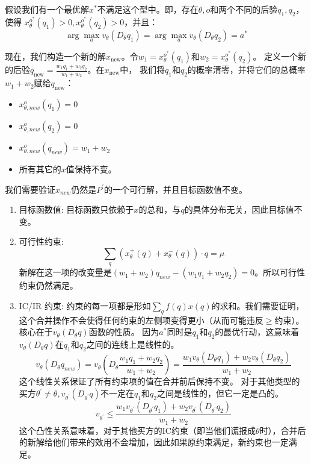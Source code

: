 假设我们有一个最优解$x^\ast$不满足这个型中。即，存在$\theta,o$和两个不同的后验$q_1,q_2$，使得
$x_{\theta}^{o^\ast}(q_1)>0, x_{\theta}^{o^\ast}(q_2)>0$，并且：
$$\arg \max_{a} v_{\theta} (D_{\theta}q_1)=\arg\max_{a}v_{\theta}(D_{\theta}q_2)=a^\ast$$

现在，我们构造一个新的解$x_{\text{new}}$。令$w_1=x_{\theta}^{o^\ast}(q_1)$和$w_2=x_{\theta}^{o^\ast}(q_2)$。
定义一个新的后验$q_{\text{new}} = \frac{w_1 q_1 + w_2 q_2}{w_1 + w_2}$。在$x_{\text{new}}$中，
我们将$q_1$和$q_2$的概率清零，并将它们的总概率$w_1 + w_2$赋给$q_{\text{new}}$：

\begin{itemize}
    \item $x_{\theta,new}^{o}(q_1) = 0$
    \item $x_{\theta,new}^{o}(q_2) = 0$
    \item $x_{\theta,new}^{o}(q_{new}) = w_1 + w_2$
    \item 所有其它的$x$值保持不变。
\end{itemize}

我们需要验证$x_{new}$仍然是$P^\prime$的一个可行解，并且目标函数值不变。

\begin{enumerate}
    \item 目标函数值: 目标函数只依赖于$x$的总和，与$q$的具体分布无关，因此目标值不变。
    \item 可行性约束:$$\sum\limits_{q}\left(x_{\theta}^{+}(q)+x_{\theta}^{-}(q)\right)\cdot q = \mu$$ 新解在这一项的改变量是$(w_1 + w_2) q_{new} - (w_1 q_1 + w_2 q_2) = 0$。所以可行性约束仍然满足。
    \item IC/IR 约束: 约束的每一项都是形如$\sum\limits_{q}f(q)x(q)$的求和。我们需要证明，这个合并操作不会使得任何约束的左侧项变得更小（从而可能违反$\geq$约束）。核心在于$v_\theta (D_\theta q)$函数的性质。
    因为$a^\ast$同时是$q_1$和$q_2$的最优行动，这意味着$v_\theta (D_\theta q)$在$q_1$和$q_2$之间的连线上是线性的。$$v_{\theta} (D_{\theta} q_{new}) = v_{\theta} \left(D_{\theta} \frac{w_1 q_1 + w_2 q_2}{w_1 + w_2}\right) = \frac{w_1 v_{\theta}(D_{\theta} q_1) + w_2 v_{\theta} (D_{\theta} q_2)}{w_1 + w_2}$$ 这个线性关系保证了所有约束项的值在合并前后保持不变。
    对于其他类型的买方$\theta^\prime \neq \theta,v_{\theta^\prime} (D_{\theta^\prime} q)$不一定在$q_1$和$q_2$之间是线性的，但它一定是凸的。$$v_{\theta^\prime}\leq \frac{w_1 v_{\theta^\prime}(D_{\theta^\prime}q_1) + w_2 v_{\theta^\prime}(D_{\theta^\prime}q_2)}{w_1 + w_2}$$ 这个凸性关系意味着，对于其他买方的IC约束（即当他们谎报成$\theta$时），合并后的新解给他们带来的效用不会增加，因此如果原约束满足，新约束也一定满足。 
\end{enumerate}

